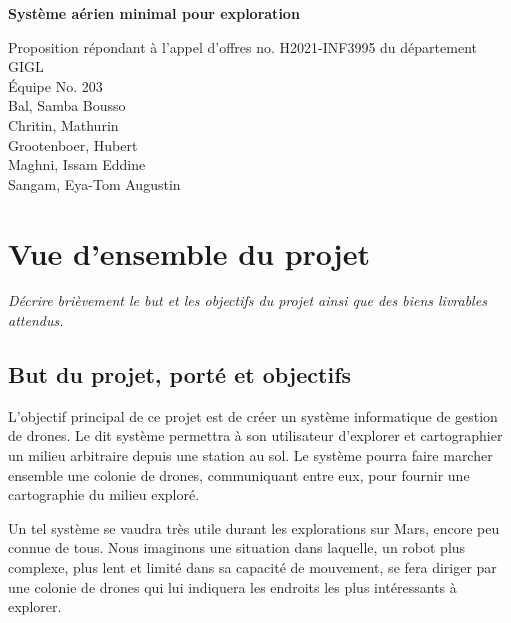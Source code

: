 \documentclass{mistcoursedoc}
\author{Équipe \equipe}
\newcommand{\equipe}{203}
\begin{document}
 

\maketitle
\vspace{2cm}
\begin{center}

  {\Huge\bf Système aérien minimal pour exploration\\[3em]}

\Large Proposition répondant à l’appel d’offres  no. H2021-INF3995 du département GIGL\\[3em]


Équipe No. \equipe\\[3em]

  Bal, Samba Bousso\\[1em]
  Chritin, Mathurin\\[1em]
  Grootenboer, Hubert\\[1em]
  Maghni, Issam Eddine\\[1em]
  Sangam, Eya-Tom Augustin\\[1em]

\vfill

\end{center}

\section{Vue d’ensemble du projet}

\textit{Décrire brièvement le but et les objectifs du projet ainsi que des biens livrables attendus.}

\subsection{But du projet, porté et objectifs}

\par L'objectif principal de ce projet est de créer un système informatique de gestion de drones.
Le dit système permettra à son utilisateur d'explorer et cartographier un milieu arbitraire depuis une station au sol.
Le système pourra faire marcher ensemble une colonie de drones, communiquant entre eux, pour fournir une cartographie du milieu exploré.

\par Un tel système se vaudra très utile durant les explorations sur Mars, encore peu connue de tous.
Nous imaginons une situation dans laquelle, un robot plus complexe, 
plus lent et limité dans sa capacité de mouvement, se fera diriger par une colonie de drones qui
lui indiquera les endroits les plus intéressants à explorer.
\end{document}
